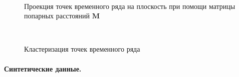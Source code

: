 \documentclass[12pt, twoside]{article}
\numberwithin{equation}{section}
\begin{document}
\begin{figure}[h!t]\center
{}
\\
\caption{Проекция точек временного ряда на плоскость при помощи матрицы попарных расстояний $\textbf{M}$}
\label{fig_synthetic_2D}
\end{figure}

\begin{figure}[h!t]\center
{}
\\
\caption{Кластеризация точек временного ряда}
\label{fig_synthetic_claster}
\end{figure}


\paragraph{Синтетические данные.}
\end{document}
